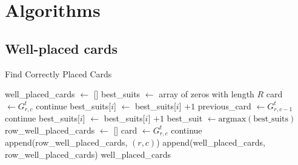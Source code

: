 \chapter{Algorithms}
\section{Well-placed cards} \label{appendix:algo}
\begin{algorithm}[H]
    \caption{Find Correctly Placed Cards}
    \begin{algorithmic}
        \State well\_placed\_cards $\gets$ []
            \State best\_suits $\gets$ array of zeros with length $R$
                \State card $\gets G^t_{r,c}$
                    \State continue
                \EndIf
                    \State best\_suits[$i$] $\gets$ best\_suits[$i$] $+ 1$
                \EndIf
                    \State previous\_card $\gets G^t_{r,c-1}$
                        \State continue
                    \EndIf
                        \State best\_suits[$i$] $\gets$ best\_suits[$i$] $+ 1$
                    \EndIf
                \EndIf
            \EndFor
            \State best\_suit $\gets \text{argmax}(\text{best\_suits})$
            \State row\_well\_placed\_cards $\gets$ []
                \State card $\gets G^t_{r,c}$
                    \State continue
                \EndIf
                    \State append(row\_well\_placed\_cards, $(r,c)$)
                \EndIf
            \EndFor
            \State append(well\_placed\_cards, row\_well\_placed\_cards)
        \EndFor
        \State \Return well\_placed\_cards
    \end{algorithmic}
\end{algorithm}
